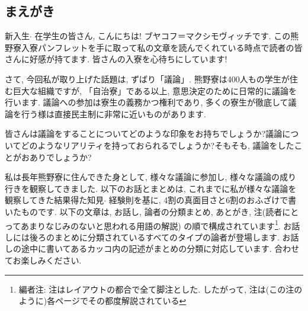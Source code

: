 \documentclass[10pt,b5jsbook,dvips,dvipdfmx,openany]{jsbook}
\theoremstyle{definition}
\begin{document}
		\subsection{まえがき}
		新入生$ \cdot $ 在学生の皆さん, こんにちは! ブヤコフ＝マクシモヴィッチです. この熊野寮入寮パンフレットを手に取って私の文章を読んでくれている時点で読者の皆さんに好感が持てます. 皆さんの入寮を心待ちにしています!

		さて, 今回私が取り上げた話題は, ずばり「議論」. 熊野寮は400人もの学生が住む巨大な組織ですが, 「自治寮」である以上, 意思決定のために日常的に議論を行います. 議論への参加は寮生の義務かつ権利であり, 多くの寮生が徹底して議論を行う様は直接民主制に非常に近いものがあります.

		皆さんは議論をすることについてどのような印象をお持ちでしょうか?議論についてどのようなリアリティを持っておられるでしょうか?そもそも, 議論をしたことがおありでしょうか?

		私は長年熊野寮に住んできた身として, 様々な議論に参加し, 様々な議論の成り行きを観察してきました. 以下のお話とまとめは, これまでに私が様々な議論を観察してきた結果得た知見$ \cdot $ 経験則を基に, 4割の真面目さと6割のおふざけで書いたものです. 以下の文章は, お話し, 論者の分類まとめ, あとがき, 注(読者にとってあまりなじみのないと思われる用語の解説) の順で構成されています\footnote{編者注: 注はレイアウトの都合で全て脚注とした. したがって, 注は(この注のように)各ページでその都度解説されている}. お話しには後ろのまとめに分類されているすべてのタイプの論者が登場します. お話しの途中に書いてあるカッコ内の記述がまとめの分類に対応しています. 合わせてお楽しみください.
\end{document}
